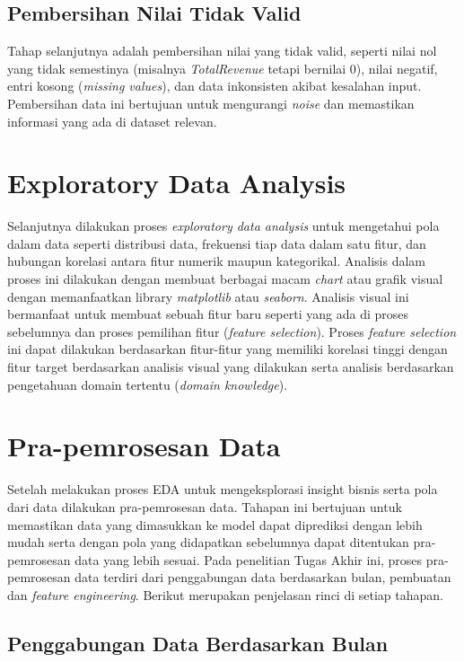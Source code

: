     \subsection{Pembersihan Nilai Tidak Valid}\label{} 
    Tahap selanjutnya adalah pembersihan nilai yang tidak valid, seperti nilai nol yang tidak semestinya (misalnya \textit{TotalRevenue} tetapi bernilai 0), nilai negatif, entri kosong (\textit{missing values}), dan data inkonsisten akibat kesalahan input. Pembersihan data ini bertujuan untuk mengurangi \textit{noise} dan memastikan informasi yang ada di dataset relevan.
    
    \section{Exploratory Data Analysis \method}\label{sec:method construction}
    Selanjutnya dilakukan proses \textit{exploratory data analysis} untuk mengetahui pola dalam data seperti distribusi data, frekuensi tiap data dalam satu fitur, dan hubungan korelasi antara fitur numerik maupun kategorikal. Analisis dalam proses ini dilakukan dengan membuat berbagai macam \textit{chart} atau grafik visual dengan memanfaatkan library \textit{matplotlib} atau \textit{seaborn}. Analisis visual ini bermanfaat untuk membuat sebuah fitur baru seperti yang ada di proses sebelumnya dan proses pemilihan fitur (\textit{feature selection}). Proses \textit{feature selection} ini dapat dilakukan berdasarkan fitur-fitur yang memiliki korelasi tinggi dengan fitur target berdasarkan analisis visual yang dilakukan serta analisis berdasarkan pengetahuan domain tertentu (\textit{domain knowledge}). 

    
    \section{Pra-pemrosesan Data}\label{} 

    Setelah melakukan proses EDA untuk mengeksplorasi insight bisnis serta pola dari data dilakukan pra-pemrosesan data. Tahapan ini bertujuan  untuk memastikan data yang dimasukkan ke model dapat diprediksi dengan lebih mudah serta dengan pola yang didapatkan sebelumnya dapat ditentukan pra-pemrosesan data yang lebih sesuai. Pada penelitian Tugas Akhir ini, proses pra-pemrosesan data terdiri dari penggabungan data berdasarkan bulan, pembuatan dan \textit{feature engineering}. Berikut merupakan penjelasan rinci di setiap tahapan.

    
    \subsection{Penggabungan Data Berdasarkan Bulan}\label{}  

